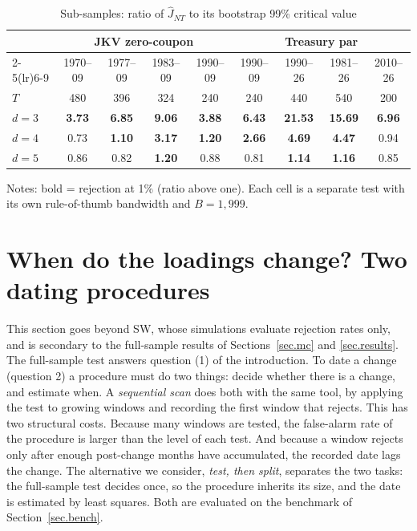\documentclass[11pt]{article}
\begin{document}
\begin{table}[htbp]
\centering
\begin{threeparttable}
\caption{Sub-samples: ratio of $\hat J_{NT}$ to its bootstrap 99\% critical value}\label{tab.sub}
\begin{tabular}{lcccccccc}
\toprule
 & \multicolumn{4}{c}{JKV zero-coupon} & \multicolumn{4}{c}{Treasury par}\\
\cmidrule(lr){2-5}\cmidrule(lr){6-9}
 & 1970--09 & 1977--09 & 1983--09 & 1990--09 & 1990--09 & 1990--26 & 1981--26 & 2010--26\\
$T$ & 480 & 396 & 324 & 240 & 240 & 440 & 540 & 200\\
\midrule
$d=3$ & \textbf{3.73} & \textbf{6.85} & \textbf{9.06} & \textbf{3.88} & \textbf{6.43} & \textbf{21.53} & \textbf{15.69} & \textbf{6.96}\\
$d=4$ & 0.73 & \textbf{1.10} & \textbf{3.17} & \textbf{1.20} & \textbf{2.66} & \textbf{4.69} & \textbf{4.47} & 0.94\\
$d=5$ & 0.86 & 0.82 & \textbf{1.20} & 0.88 & 0.81 & \textbf{1.14} & \textbf{1.16} & 0.85\\
\bottomrule
\end{tabular}
\begin{tablenotes}\small
\item Notes: bold = rejection at 1\% (ratio above one). Each cell is a separate test with its own rule-of-thumb bandwidth and $B=1{,}999$.
\end{tablenotes}
\end{threeparttable}
\end{table}

\section{When do the loadings change? Two dating procedures}\label{sec.scan}

This section goes beyond SW, whose simulations evaluate rejection rates only, and is secondary to the full-sample results of Sections~\ref{sec.mc} and \ref{sec.results}. The full-sample test answers question (1) of the introduction. To date a change (question 2) a procedure must do two things: decide whether there is a change, and estimate when. A \emph{sequential scan} does both with the same tool, by applying the test to growing windows and recording the first window that rejects. This has two structural costs. Because many windows are tested, the false-alarm rate of the procedure is larger than the level of each test. And because a window rejects only after enough post-change months have accumulated, the recorded date lags the change. The alternative we consider, \emph{test, then split}, separates the two tasks: the full-sample test decides once, so the procedure inherits its size, and the date is estimated by least squares. Both are evaluated on the benchmark of Section~\ref{sec.bench}. 
\end{document}
